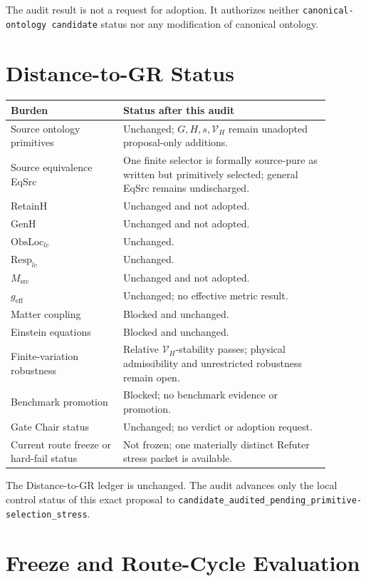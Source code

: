 \documentclass[11pt]{article}
\newcommand{\Vary}{\mathcal V_H}
\begin{document}
The audit result is not a request for adoption.  It authorizes neither
\texttt{canonical-ontology candidate} status nor any modification of
canonical ontology.

\section{Distance-to-GR Status}

\begin{longtable}{p{0.31\linewidth}p{0.58\linewidth}}
\toprule
Burden & Status after this audit\\
\midrule
Source ontology primitives & Unchanged; \(G,H,s,\Vary\) remain unadopted proposal-only additions.\\
Source equivalence EqSrc & One finite selector is formally source-pure as written but primitively selected; general EqSrc remains undischarged.\\
RetainH & Unchanged and not adopted.\\
GenH & Unchanged and not adopted.\\
\(\mathrm{ObsLoc}_{lc}\) & Unchanged.\\
\(\mathrm{Resp}_{lc}\) & Unchanged.\\
\(M_{\mathrm{src}}\) & Unchanged and not adopted.\\
\(g_{\mathrm{eff}}\) & Unchanged; no effective metric result.\\
Matter coupling & Blocked and unchanged.\\
Einstein equations & Blocked and unchanged.\\
Finite-variation robustness & Relative \(\Vary\)-stability passes; physical admissibility and unrestricted robustness remain open.\\
Benchmark promotion & Blocked; no benchmark evidence or promotion.\\
Gate Chair status & Unchanged; no verdict or adoption request.\\
Current route freeze or hard-fail status & Not frozen; one materially distinct Refuter stress packet is available.\\
\bottomrule
\end{longtable}

The Distance-to-GR ledger is unchanged.  The audit advances only the local
control status of this exact proposal to
\texttt{candidate\_audited\_pending\_primitive-selection\_stress}.

\section{Freeze and Route-Cycle Evaluation}
\end{document}
